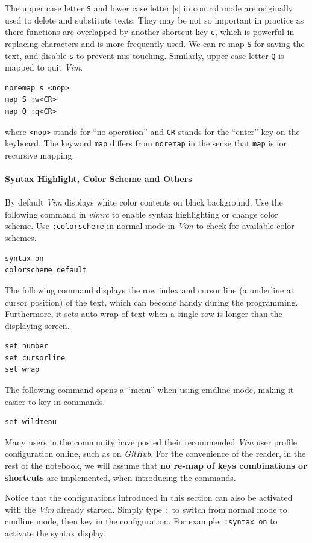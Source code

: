 The upper case letter \verb|S| and lower case letter |s| in control mode are originally used to delete and substitute texts. They may be not so important in practice as there functions are overlapped by another shortcut key \verb|c|, which is powerful in replacing characters and is more frequently used. We can re-map \verb|S| for saving the text, and disable \verb|s| to prevent mis-touching. Similarly, upper case letter \verb|Q| is mapped to quit \textit{Vim}.
\begin{verbatim}
noremap s <nop>
map S :w<CR>
map Q :q<CR>
\end{verbatim}
where \verb|<nop>| stands for ``no operation'' and \verb|CR| stands for the ``enter'' key on the keyboard. The keyword \verb|map| differs from \verb|noremap| in the sense that \verb|map| is for recursive mapping.
\\
\\
\noindent \textbf{Syntax Highlight, Color Scheme and Others}
\\
\\
By default \textit{Vim} displays white color contents on black background. Use the following command in \textit{vimrc} to enable syntax highlighting or change color scheme. Use \verb|:colorscheme| in normal mode in \textit{Vim} to check for available color schemes.
\begin{verbatim}
syntax on
colorscheme default
\end{verbatim}

The following command displays the row index and cursor line (a underline at cursor position) of the text, which can become handy during the programming. Furthermore, it sets auto-wrap of text when a single row is longer than the displaying screen.
\begin{verbatim}
set number
set cursorline
set wrap
\end{verbatim}

The following command opens a ``menu'' when using cmdline mode, making it easier to key in commands.
\begin{verbatim}
set wildmenu
\end{verbatim}

Many users in the community have posted their recommended \textit{Vim} user profile configuration online, such as on \textit{GitHub}. For the convenience of the reader, in the rest of the notebook, we will assume that \textbf{no re-map of keys combinations or shortcuts} are implemented, when introducing the commands.

Notice that the configurations introduced in this section can also be activated with the \textit{Vim} already started. Simply type \verb|:| to switch from normal mode to cmdline mode, then key in the configuration. For example, \verb|:syntax on| to activate the syntax display.  

